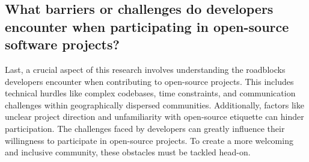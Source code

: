 \subsection{What barriers or challenges do developers encounter when participating in open-source software projects?}

Last, a crucial aspect of this research involves understanding the roadblocks developers encounter when contributing to open-source projects. This includes technical hurdles like complex codebases, time constraints, and communication challenges within geographically dispersed communities. Additionally, factors like unclear project direction and unfamiliarity with open-source etiquette can hinder participation. The challenges faced by developers can greatly influence their willingness to participate in open-source projects. To create a more welcoming and inclusive community, these obstacles must be tackled head-on.


\clearpage  %
